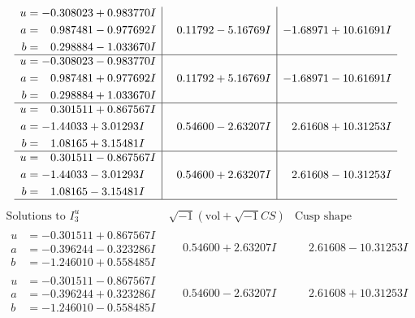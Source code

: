 \documentclass[1p]{elsarticle_modified}
\theoremstyle{definition}
\newcommand{\I}{\sqrt{-1}}
\begin{document}
$$\begin{array}{c|c|c}
\begin{aligned}
u &= -0.308023 + 0.983770 I \\
a &= \phantom{-}0.987481 - 0.977692 I \\
b &= \phantom{-}0.298884 - 1.033670 I\end{aligned}
 & \phantom{-}0.11792 - 5.16769 I & -1.68971 + 10.61691 I \\ \hline\begin{aligned}
u &= -0.308023 - 0.983770 I \\
a &= \phantom{-}0.987481 + 0.977692 I \\
b &= \phantom{-}0.298884 + 1.033670 I\end{aligned}
 & \phantom{-}0.11792 + 5.16769 I & -1.68971 - 10.61691 I \\ \hline\begin{aligned}
u &= \phantom{-}0.301511 + 0.867567 I \\
a &= -1.44033 + 3.01293 I \\
b &= \phantom{-}1.08165 + 3.15481 I\end{aligned}
 & \phantom{-}0.54600 - 2.63207 I & \phantom{-}2.61608 + 10.31253 I \\ \hline\begin{aligned}
u &= \phantom{-}0.301511 - 0.867567 I \\
a &= -1.44033 - 3.01293 I \\
b &= \phantom{-}1.08165 - 3.15481 I\end{aligned}
 & \phantom{-}0.54600 + 2.63207 I & \phantom{-}2.61608 - 10.31253 I\\
 \hline 
 \end{array}$$\newpage$$\begin{array}{c|c|c}  
\text{Solutions to }I^u_{3}& \I (\text{vol} + \sqrt{-1}CS) & \text{Cusp shape}\\
 \hline 
\begin{aligned}
u &= -0.301511 + 0.867567 I \\
a &= -0.396244 - 0.323286 I \\
b &= -1.246010 + 0.558485 I\end{aligned}
 & \phantom{-}0.54600 + 2.63207 I & \phantom{-}2.61608 - 10.31253 I \\ \hline\begin{aligned}
u &= -0.301511 - 0.867567 I \\
a &= -0.396244 + 0.323286 I \\
b &= -1.246010 - 0.558485 I\end{aligned}
 & \phantom{-}0.54600 - 2.63207 I & \phantom{-}2.61608 + 10.31253 I \\ \hline\begin{aligned}

\end{aligned}
\end{array}$$
\end{document}
